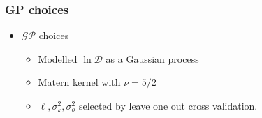 \documentclass{beamer}
\begin{document}
\begin{frame}
    \frametitle{GP choices}
    \begin{itemize}
        \item $\mathcal{GP}$ choices
              \begin{itemize}
                  \item Modelled $\ln\mathcal{D}$ as a Gaussian process
                  \item Matern kernel with $\nu = 5/2$
                  \item $\ell, \sigma^2_k, \sigma^2_o$ selected by leave
                        one out cross validation.
              \end{itemize}
    \end{itemize}
\end{frame}
\end{document}
